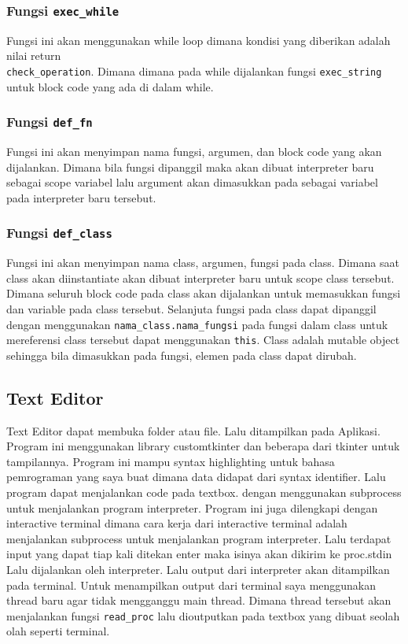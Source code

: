 \documentclass{article}
\begin{document}
\subsubsection{Fungsi \texttt{exec\_while}}
Fungsi ini akan menggunakan while loop dimana kondisi yang diberikan adalah nilai return \\ \texttt{check\_operation}. Dimana dimana pada while dijalankan
fungsi \texttt{exec\_string} untuk block code yang ada di dalam while.
\subsubsection{Fungsi \texttt{def\_fn}}
Fungsi ini akan menyimpan nama fungsi, argumen, dan block code yang akan dijalankan. Dimana bila fungsi dipanggil maka
akan dibuat interpreter baru sebagai scope variabel lalu argument akan dimasukkan pada sebagai variabel pada interpreter baru
tersebut. 
\subsubsection{Fungsi \texttt{def\_class}}
Fungsi ini akan menyimpan nama class, argumen, fungsi pada class. Dimana saat class akan diinstantiate akan
dibuat interpreter baru untuk scope class tersebut. Dimana seluruh block code pada class akan dijalankan untuk memasukkan
fungsi dan variable pada class tersebut. Selanjuta fungsi pada class dapat dipanggil dengan menggunakan \texttt{nama\_class.nama\_fungsi}
pada fungsi dalam class untuk mereferensi class tersebut dapat menggunakan \texttt{this}. Class adalah mutable object
sehingga bila dimasukkan pada fungsi, elemen pada class dapat dirubah.
\subsection{Text Editor}
Text Editor dapat membuka folder atau file. Lalu ditampilkan pada Aplikasi. Program ini menggunakan
library customtkinter dan beberapa dari tkinter untuk tampilannya. Program ini mampu syntax highlighting
untuk bahasa pemrograman yang saya buat dimana data didapat dari syntax identifier. Lalu program dapat menjalankan code pada textbox.
dengan menggunakan subprocess untuk menjalankan program interpreter. Program ini juga dilengkapi dengan interactive terminal
dimana cara kerja dari interactive terminal adalah menjalankan subprocess untuk menjalankan program interpreter. 
Lalu terdapat input yang dapat tiap kali ditekan enter maka isinya akan dikirim ke proc.stdin Lalu dijalankan
oleh interpreter. Lalu output dari interpreter akan ditampilkan pada terminal. Untuk menampilkan output dari terminal
saya menggunakan thread baru agar tidak mengganggu main thread. Dimana thread tersebut akan menjalankan fungsi \texttt{read\_proc} lalu 
dioutputkan pada textbox yang dibuat seolah olah seperti terminal. 
\end{document}
